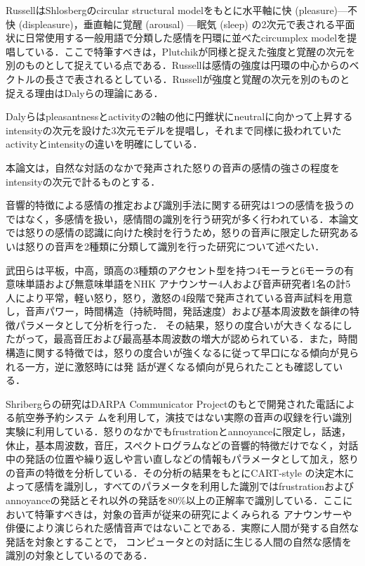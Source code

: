 \documentclass[japanese]{jnlp_1.3c}
\begin{document}
RussellはShlosbergのcircular structural modelをもとに水平軸に快 (pleasure)—不快 (displeasure)，垂直軸に覚醒 (arousal) —眠気 (sleep) の2次元で表される平面状に日常使用する一般用語で分類した感情を円環に並べたcircumplex modelを提唱している\cite{russell1989}．ここで特筆すべきは，Plutchikが同様と捉えた強度と覚醒の次元を別のものとして捉えている点である．Russellは感情の強度は円環の中心からのベクトルの長さで表されるとしている．Russellが強度と覚醒の次元を別のものと捉える理由はDalyらの理論にある．

Dalyらはpleasantnessとactivityの2軸の他に円錐状にneutralに向かって上昇するintensityの次元を設けた3次元モデルを提唱し，それまで同様に扱われていたactivityとintensityの違いを明確にしている\cite{daly1983}．

本論文は，自然な対話のなかで発声された怒りの音声の感情の強さの程度をintensityの次元で計るものとする．

音響的特徴による感情の推定および識別手法に関する研究は1つの感情を扱うのではなく，多感情を扱い，感情間の識別を行う研究が多く行われている．本論文では怒りの感情の認識に向けた検討を行うため，怒りの音声に限定した研究あるいは怒りの音声を2種類に分類して識別を行った研究について述べたい．

武田らは平板，中高，頭高の3種類のアクセント型を持つ4モーラと6モーラの有意味単語および無意味単語をNHK
アナウンサー4人および音声研究者1名の計5人により平常，軽い怒り，怒り，激怒の4段階で発声されている音声試料を用意し，音声パワー，時間構造（持続時間，発話速度）および基本周波数を韻律の特徴パラメータとして分析を行った\cite{Takeda2002}．
その結果，怒りの度合いが大きくなるにしたがって，最高音圧および最高基本周波数の増大が認められている．また，時間構造に関する特徴では，怒りの度合いが強くなるに従って早口になる傾向が見られる一方，逆に激怒時には発
話が遅くなる傾向が見られたことも確認している．

Shribergらの研究はDARPA Communicator Projectのもとで開発された電話による航空券予約システ
ムを利用して，演技ではない実際の音声の収録を行い識別実験に利用している．怒りのなかでもfrustrationとannoyanceに限定し，話速，休止，基本周波数，音圧，スペクトログラムなどの音響的特徴だけでなく，対話中の発話の位置や繰り返しや言い直しなどの情報もパラメータとして加え，怒りの音声の特徴を分析している\cite{Ang2002}．その分析の結果をもとにCART-style の決定木によって感情を識別し，すべてのパラメータを利用した識別ではfrustrationおよびannoyanceの発話とそれ以外の発話を80\%以上の正解率で識別している．ここにおいて特筆すべきは，対象の音声が従来の研究によくみられる
アナウンサーや俳優により演じられた感情音声ではないことである．実際に人間が発する自然な発話を対象とすることで，
コンピュータとの対話に生じる人間の自然な感情を識別の対象としているのである．
\end{document}
